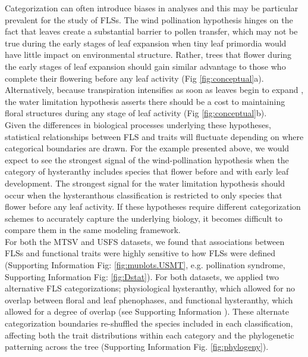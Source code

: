 \documentclass[11pt]{article}
\begin{document}
\noindent Categorization can often introduce biases in analyses \citep{Royston2006,Edwards2015} and this may be particular prevalent for the study of FLSs. The wind pollination hypothesis hinges on the fact that leaves create a substantial barrier to pollen transfer, which may not be true during the early stages of leaf expansion when tiny leaf primordia would have little impact on environmental structure. Rather, trees that flower during the early stages of leaf expansion should gain similar advantage to those who complete their flowering before any leaf activity (Fig \ref{fig:conceptual}a). Alternatively, because transpiration intensifies as soon as leaves begin to expand \citep{%
Wang2018}, the water limitation  hypothesis asserts there should be a cost to maintaining floral structures during any stage of leaf activity (Fig \ref{fig:conceptual}b).\\ 

\noindent Given the differences in biological processes underlying these hypotheses, statistical relationships between FLS and traits will fluctuate depending on where categorical boundaries are drawn. For the example presented above, we would expect to see the strongest signal of the wind-pollination hypothesis when the category of hysteranthy includes species that flower before and with early leaf development. The strongest signal for the water limitation  hypothesis should occur when the hysteranthous classification is restricted to only species that flower before any leaf activity. If these hypotheses require different categorization schemes to accurately capture the underlying biology, it becomes difficult to compare them in the same modeling framework.\\

\noindent For both the MTSV and USFS datasets, we found that associations between FLSs and functional traits were highly sensitive to how FLSs were defined (Supporting Information Fig: \ref{fig:muplots.USMT}, e.g. pollination syndrome, Supporting Information Fig: \ref{fig:Dstat}). For both datasets, we applied two alternative FLS categorizations; physiological hysteranthy, which allowed for no overlap between floral and leaf phenophases, and functional hysteranthy, which allowed for a degree of overlap (see Supporting Information ). These alternate categorization boundaries re-shuffled the species included in each classification, affecting both the trait distributions within each category and the phylogenetic patterning across the tree (Supporting Information Fig. \ref{fig:phylogeny}).\\ 
 
\end{document}
